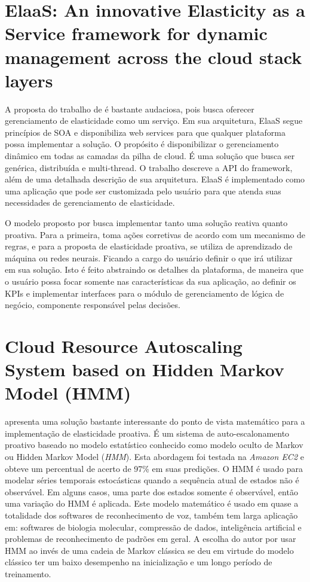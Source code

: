 \documentclass[twoside,english,brazilian]{UNISINOSmonografia}
\begin{document}
\section{ElaaS: An innovative Elasticity as a Service framework for dynamic management across the cloud stack layers}
A proposta do trabalho de \cite{Kranas2012} é bastante audaciosa, pois busca oferecer gerenciamento de elasticidade como um serviço. Em sua arquitetura, ElaaS segue princípios de SOA e disponibiliza web services para que qualquer plataforma possa implementar a solução. O propósito é disponibilizar o gerenciamento dinâmico em todas as camadas da pilha de cloud. É uma solução que busca ser genérica, distribuída e multi-thread. O trabalho descreve a API do framework, além de uma detalhada descrição de sua arquitetura. ElaaS é implementado como uma aplicação que pode ser customizada pelo usuário para que atenda suas necessidades de gerenciamento de elasticidade. 

O modelo proposto por \cite{Kranas2012} busca implementar tanto uma solução reativa quanto proativa. Para a primeira, toma ações corretivas de acordo com um mecanismo de regras, e para a proposta de elasticidade proativa, se utiliza de aprendizado de máquina ou redes neurais. Ficando a cargo do usuário definir o que irá utilizar em sua solução. Isto é feito abstraindo os detalhes da plataforma, de maneira que o usuário possa focar somente nas características da sua aplicação, ao definir os KPIs e implementar interfaces para o módulo de gerenciamento de lógica de negócio, componente responsável pelas decisões. 


\section{Cloud Resource Autoscaling System based on Hidden Markov Model (HMM)}
\cite{Nikravesh2014} apresenta uma solução bastante interessante do ponto de vista matemático para a implementação de elasticidade proativa. É um sistema de auto-escalonamento proativo baseado no modelo estatístico conhecido como modelo oculto de Markov ou Hidden Markov Model (\textit{HMM}). Esta abordagem foi testada na \textit{Amazon EC2} e obteve um percentual de acerto de 97\% em suas predições. O HMM é usado para modelar séries temporais estocásticas quando a sequência atual de estados não é observável. Em alguns casos, uma parte dos estados somente é observável, então uma variação do HMM é aplicada. Este modelo matemático é usado em quase a totalidade dos softwares de reconhecimento de voz, também tem larga aplicação em: softwares de biologia molecular, compressão de dados, inteligência artificial e problemas de reconhecimento de padrões em geral. A escolha do autor por usar HMM ao invés de uma cadeia de Markov clássica se deu em virtude do modelo clássico ter um baixo desempenho na inicialização e um longo período de treinamento.
\end{document}
